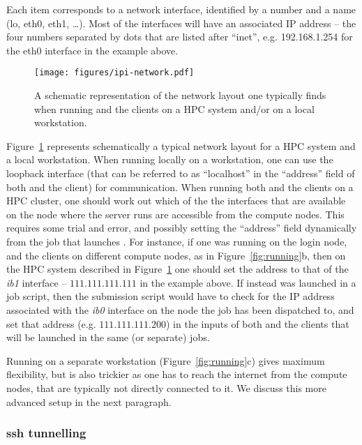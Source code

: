 \documentclass[11pt,english,fleqn]{report}
\begin{document}
Each item corresponds to a network interface, identified by a number and a name (lo, eth0, eth1, \ldots).
Most of the interfaces will have an associated IP address -- the four numbers separated by dots
that are listed after ``inet'', e.g. 192.168.1.254 for the eth0 interface in the example above.

\begin{figure}[hbt]
\centering\texttt{[image: figures/ipi-network.pdf]}
\caption{\label{fig:network} A schematic representation of the network layout one 
typically finds when running \ipi and the clients on a HPC system and/or on a local workstation. } 
\end{figure}

Figure~\ref{fig:network} represents schematically a typical network layout
for a HPC system and a local workstation. When running \ipi locally on a 
workstation, one can use the loopback interface (that can be referred to as 
``localhost'' in the ``address'' field of both \ipi and the client) for communication.
When running both \ipi and the clients on a HPC cluster, one should work out which of the
the interfaces that are available on the node where the \ipi server runs are accessible from the
compute nodes. This requires some trial and error, and possibly setting the 
 ``address'' field dynamically from the job that launches \ipi. 
 For instance,
if one was running \ipi on the login node, and the clients on different compute nodes, as 
in Figure~\ref{fig:running}b, then on the HPC system described in Figure~\ref{fig:network} 
one should set the address to that of the \emph{ib1} interface -- $111.111.111.111$ in 
the example above. If instead \ipi was launched in a job script, then the submission script would
have to check for the IP address associated with the \emph{ib0} interface on the node
the job has been dispatched to, and set that address (e.g. $111.111.111.200$) in the inputs
of both \ipi and the clients that will be launched in the same (or separate) jobs.

Running \ipi on a separate workstation (Figure~\ref{fig:running}c) gives 
maximum flexibility, but is also trickier as one has to reach the 
internet from the compute nodes, that are typically not directly connected to it. 
We discuss this more advanced setup in the next paragraph.

\subsubsection{ssh tunnelling}
\end{document}
